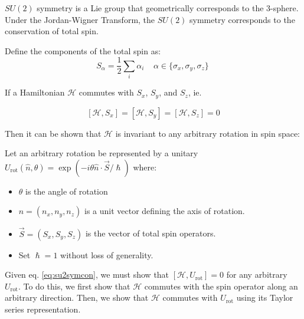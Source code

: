 \documentclass{article}
\newcommand{\ham}{\mathcal{H}}
\newcommand{\urot}{U_{\text{rot}}}
\begin{document}
$SU(2)$ symmetry is a Lie group that geometrically corresponds to the 3-sphere. Under the Jordan-Wigner Transform, the $SU(2)$ symmetry corresponds to the conservation of total spin.  

Define the components of the total spin as:
\begin{equation}
S_\alpha = \frac{1}{2}\sum_i\alpha_i~~~~~\alpha \in \{\sigma_x, \sigma_y, \sigma_z\}\    
\end{equation}

If a Hamiltonian $\ham$ commutes with $S_x$, $S_y$, and $S_z$, ie.

\begin{equation}\label{eq:su2symcon}
    [\ham, S_x] = [\ham, S_y] = [\ham, S_z] = 0
\end{equation}

Then it can be shown that $\ham$ is invariant to any arbitrary rotation in spin space:

Let an arbitrary rotation be represented by a unitary $\urot(\hat{n}, \theta) = \exp(-i \theta \hat{n}\cdot \vec{S}/\hslash)$ where:
\begin{itemize}
    \item $\theta$ is the angle of rotation
    \item $\hat{n} = (n_x, n_y, n_z)$ is a unit vector defining the axis of rotation.
    \item $\vec{S} = (S_x,S_y,S_z)$ is the vector of total spin operators.
    \item Set $\hslash= 1$ without loss of generality.
\end{itemize}

Given eq. \eqref{eq:su2symcon}, we must show that $[\ham, \urot] = 0$ for any arbitrary $\urot$. To do this, we first show that $\ham$ commutes with the spin operator along an arbitrary direction. Then, we show that $\ham$ commutes with $\urot$ using its Taylor series representation.
\end{document}
